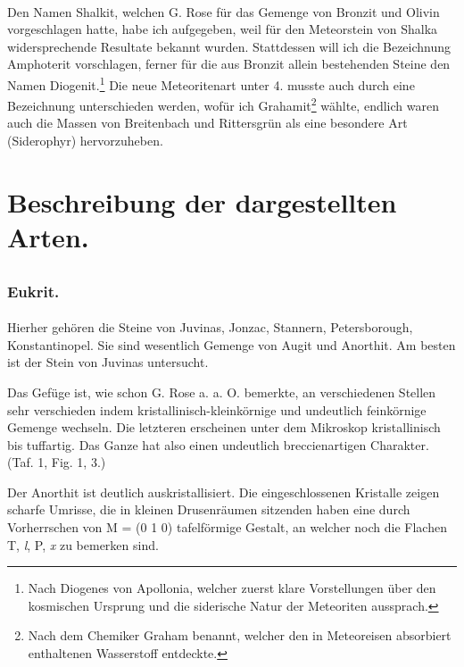 \documentclass[a4paper, 11pt, oneside, polutonikogreek, german]{article}
\begin{document}
\paragraph*{}
Den Namen Shalkit, welchen G. Rose für das Gemenge von Bronzit und Olivin vorgeschlagen hatte, habe ich aufgegeben, weil für den Meteorstein von Shalka widersprechende Resultate bekannt wurden. Stattdessen will ich die Bezeichnung Amphoterit vorschlagen, ferner für die aus Bronzit allein bestehenden Steine den Namen Diogenit.\footnote{Nach Diogenes von Apollonia, welcher zuerst klare Vorstellungen über den kosmischen Ursprung und die siderische Natur der Meteoriten aussprach.} Die neue Meteoritenart unter 4. musste auch durch eine Bezeichnung unterschieden werden, wofür ich Grahamit\footnote{Nach dem Chemiker Graham benannt, welcher den in Meteoreisen absorbiert enthaltenen Wasserstoff entdeckte.} wählte, endlich waren auch die Massen von Breitenbach und Rittersgrün als eine besondere Art (Siderophyr) hervorzuheben.
\clearpage
\section{Beschreibung der dargestellten Arten.}
\subsection{}
\subsubsection{Eukrit.}
\paragraph{}
Hierher gehören die Steine von Juvinas, Jonzac, Stannern, Petersborough, Konstantinopel. Sie sind wesentlich Gemenge von Augit und Anorthit. Am besten ist der Stein von Juvinas untersucht.

Das Gefüge ist, wie schon G. Rose a. a. O. bemerkte, an verschiedenen Stellen sehr verschieden indem kristallinisch-kleinkörnige und undeutlich feinkörnige Gemenge wechseln. Die letzteren erscheinen unter dem Mikroskop kristallinisch bis tuffartig. Das Ganze hat also einen undeutlich breccienartigen Charakter. (Taf. 1, Fig. 1, 3.)

Der Anorthit ist deutlich auskristallisiert. Die eingeschlossenen Kristalle zeigen scharfe Umrisse, die in kleinen Drusenräumen sitzenden haben eine durch Vorherrschen von M = (0 1 0) tafelförmige Gestalt, an welcher noch die Flachen T, \emph{l}, P, \emph{x} zu bemerken sind.
\end{document}
